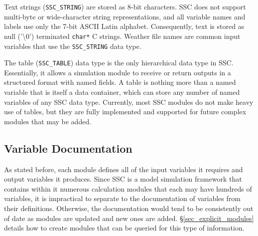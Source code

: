 \documentclass{article}
\begin{document}
Text strings (\texttt{SSC\_STRING})  are stored as 8-bit characters.  SSC does not support multi-byte or wide-character string representations, and all variable names and labels use only the 7-bit ASCII Latin alphabet.  Consequently, text is stored as null ('\textbackslash 0') terminated \texttt{char*} C strings.  Weather file names are common input variables that use the \texttt{SSC\_STRING} data type.

The table (\texttt{SSC\_TABLE}) data type is the only hierarchical data type in SSC.  Essentially, it allows a simulation module to receive or return outputs in a structured format with named fields.  A table is nothing more than a named variable that is itself a data container, which can store any number of named variables of any SSC data type.  Currently, most SSC modules do not make heavy use of tables, but they are fully implemented and supported for future complex modules that may be added.

\subsection{Variable Documentation}
\label{sec_variable_docs}

As stated before, each module defines all of the input variables it requires and output variables it produces.  Since SSC is a model simulation framework that contains within it numerous calculation modules that each may have hundreds of variables, it is impractical to separate to the documentation of variables from their definitions.  Otherwise, the documentation would tend to be consistently out of date as modules are updated and new ones are added.  \S\ref{sec_explicit_modules} details how to create modules that can be queried for this type of information.
\end{document}
